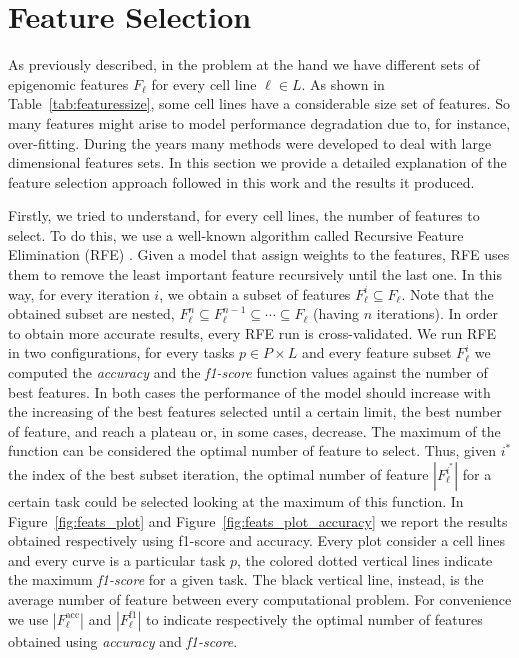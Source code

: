 \section{Feature Selection} \label{sec:featureselection}
As previously described, in the problem at the hand we have different sets of epigenomic features $F_\ell$ for every cell line $\ell \in L$. As shown in Table~\ref{tab:featuressize}, some cell lines have a considerable size set of features. So many features might arise to model performance degradation due to, for instance, over-fitting. During the years many methods were developed to deal with large dimensional features sets. In this section we provide a detailed explanation of the feature selection approach followed in this work and the results it produced. 

Firstly, we tried to understand, for every cell lines, the number of features to select. To do this, we use a well-known algorithm called Recursive Feature Elimination (RFE) \cite{VapnikRFE}. Given a model that assign weights to the features, RFE uses them to remove the least important feature recursively until the last one. In this way, for every iteration $i$, we obtain a subset of features $F_{\ell}^{i} \subseteq F_\ell$. Note that the obtained subset are nested, $F_{\ell}^{n}  \subseteq  F_{\ell}^{n-1} \subseteq \cdots \subseteq F_{\ell}$ (having $n$ iterations). In order to obtain more accurate results, every RFE run is cross-validated. We run RFE in two configurations, for every tasks $p \in P \times L$ and every feature subset $F_\ell^i$ we computed the \emph{accuracy} and the \emph{f1-score} function values against the number of best features. In both cases the performance of the model should increase with the increasing of the best features selected until a certain limit, the best number of feature, and reach a plateau or, in some cases, decrease. The maximum of the function can be considered the optimal number of feature to select. Thus, given $i^{*}$ the index of the best subset iteration, the optimal number of feature $|F_\ell^{i^{*}}|$ for a certain task could be selected looking at the maximum of this function. In Figure~\ref{fig:feats_plot} and Figure~\ref{fig:feats_plot_accuracy} we report the results obtained respectively using f1-score and accuracy. Every plot consider a cell lines and every curve is a particular task $p$, the colored dotted vertical lines indicate the maximum \emph{f1-score} for a given task. The black vertical line, instead, is the average number of feature between every computational problem. For convenience we use $|F_\ell^{\textrm{acc}}|$ and $|F_\ell^{\textrm{f1}}|$ to indicate respectively the optimal number of features obtained using \emph{accuracy} and \emph{f1-score}.

